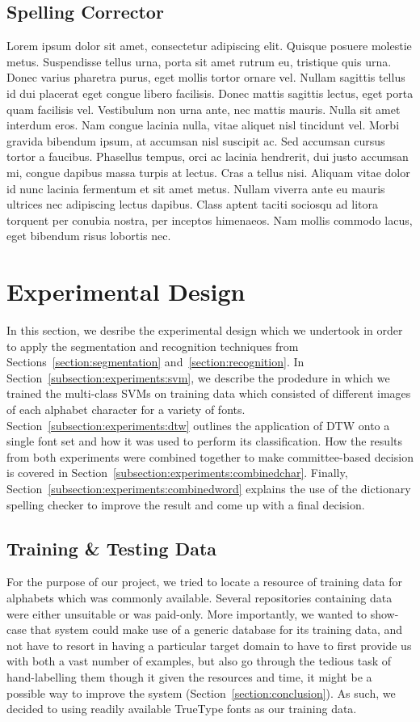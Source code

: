 \documentclass[12pt]{article}
\begin{document}
	\subsection{Spelling Corrector}
	\label{subsection:spellingcheck}
	Lorem ipsum dolor sit amet, consectetur adipiscing elit. Quisque posuere molestie metus. Suspendisse tellus urna, porta sit amet rutrum eu, tristique quis urna. Donec varius pharetra purus, eget mollis tortor ornare vel. Nullam sagittis tellus id dui placerat eget congue libero facilisis. Donec mattis sagittis lectus, eget porta quam facilisis vel. Vestibulum non urna ante, nec mattis mauris. Nulla sit amet interdum eros. Nam congue lacinia nulla, vitae aliquet nisl tincidunt vel. Morbi gravida bibendum ipsum, at accumsan nisl suscipit ac. Sed accumsan cursus tortor a faucibus. Phasellus tempus, orci ac lacinia hendrerit, dui justo accumsan mi, congue dapibus massa turpis at lectus. Cras a tellus nisi. Aliquam vitae dolor id nunc lacinia fermentum et sit amet metus. Nullam viverra ante eu mauris ultrices nec adipiscing lectus dapibus. Class aptent taciti sociosqu ad litora torquent per conubia nostra, per inceptos himenaeos. Nam mollis commodo lacus, eget bibendum risus lobortis nec.
	
	
\section{Experimental Design}
\label{section:experiments}
In this section, we desribe the experimental design which we undertook in order to apply the segmentation and recognition techniques from Sections~\ref{section:segmentation} and~\ref{section:recognition}. In Section~\ref{subsection:experiments:svm}, we describe the prodedure in which we trained the multi-class SVMs on training data which consisted of different images of each alphabet character for a variety of fonts. Section~\ref{subsection:experiments:dtw} outlines the application of DTW onto a single font set and how it was used to perform its classification. How the results from both experiments were combined together to make committee-based decision is covered in Section~\ref{subsection:experiments:combinedchar}. Finally, Section~\ref{subsection:experiments:combinedword} explains the use of the dictionary spelling checker to improve the result and come up with a final decision.
	
	\subsection{Training \& Testing Data}
	For the purpose of our project, we tried to locate a resource of training data for alphabets which was commonly available. Several repositories containing data were either unsuitable or was paid-only. More importantly, we wanted to show-case that system could make use of a generic database for its training data, and not have to resort in having a particular target domain to have to first provide us with both a vast number of examples, but also go through the tedious task of hand-labelling them though it given the resources and time, it might be a possible way to improve the system (Section~\ref{section:conclusion}). As such, we decided to using readily available TrueType fonts as our training data.
			
\end{document}
